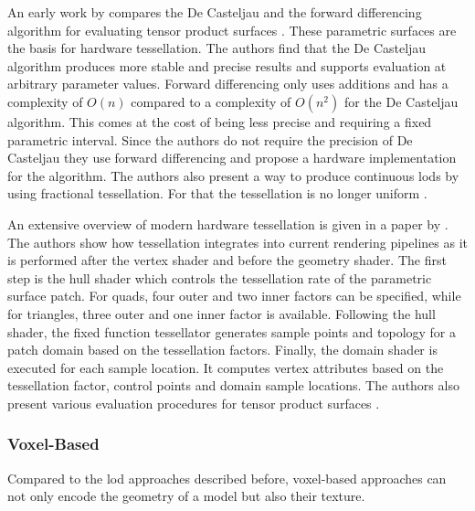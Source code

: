 An early work by \citeauthor{moreton_tessellation} compares the De Casteljau and the forward differencing algorithm for evaluating tensor product surfaces \cite{moreton_tessellation}.
These parametric surfaces are the basis for hardware tessellation.
The authors find that the De Casteljau algorithm produces more stable and precise results and supports evaluation at arbitrary parameter values.
Forward differencing only uses additions and has a complexity of $O(n)$ compared to a complexity of $O(n^2)$ for the De Casteljau algorithm.
This comes at the cost of being less precise and requiring a fixed parametric interval.
Since the authors do not require the precision of De Casteljau they use forward differencing and propose a hardware implementation for the algorithm.
The authors also present a way to produce continuous \acp{lod} by using fractional tessellation.
For that the tessellation is no longer uniform \cite{moreton_tessellation}.

An extensive overview of modern hardware tessellation is given in a paper by \citeauthor{niessner_tessellation} \cite{niessner_tessellation}.
The authors show how tessellation integrates into current rendering pipelines as it is performed after the vertex shader and before the geometry shader.
The first step is the hull shader which controls the tessellation rate of the parametric surface patch.
For quads, four outer and two inner factors can be specified, while for triangles, three outer and one inner factor is available.
Following the hull shader, the fixed function tessellator generates sample points and topology for a patch domain based on the tessellation factors.
Finally, the domain shader is executed for each sample location.
It computes vertex attributes based on the tessellation factor, control points and domain sample locations.
The authors also present various evaluation procedures for tensor product surfaces \cite{niessner_tessellation}.

\subsubsection*{Voxel-Based}
Compared to the \ac{lod} approaches described before, voxel-based approaches can not only encode the geometry of a model but also their texture.


